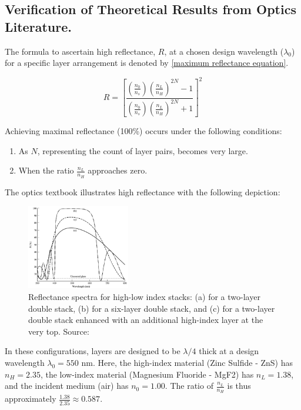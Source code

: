 \subsection{Verification of Theoretical Results from Optics Literature.}
The formula to ascertain high reflectance, $R$, at a chosen design wavelength ($\lambda_0$) for a specific layer arrangement is denoted by \ref{maximum reflectance equation}.

\begin{equation}\label{formula for optimal reflectance - chap4}
    R = \left[ \frac{ \left( \frac{n_0}{n_s} \right) \left( \frac{n_L}{n_H} \right)^{2N}  - 1 }{  \left( \frac{n_0}{n_s} \right) \left( \frac{n_L}{n_H} \right)^{2N}  + 1}  \right]^2
\end{equation}

Achieving maximal reflectance (100\%) occurs under the following conditions:
\begin{enumerate}
    \item As $N$, representing the count of layer pairs, becomes very large.
    \item When the ratio $\frac{n_L}{n_H}$ approaches zero.
\end{enumerate}

The optics textbook illustrates high reflectance with the following depiction:

\begin{figure}[ht!]
\centering
\includegraphics[width=0.4\textwidth]{Chapters/Figures/Chapter 4 Figures/High-Reflectance Graphs in the Optics Book.png}
\caption{Reflectance spectra for high-low index stacks: (a) for a two-layer double stack, (b) for a six-layer double stack, and (c) for a two-layer double stack enhanced with an additional high-index layer at the very top. Source: \cite{pedrotti_introduction_2007}}
\label{fig:Reflectance spectra from optical literature}
\end{figure}

In these configurations, layers are designed to be $\lambda/4$ thick at a design wavelength $\lambda_0 = 550$ nm. Here, the high-index material (Zinc Sulfide - ZnS) has $n_H = 2.35$, the low-index material (Magnesium Fluoride - MgF2) has $n_L = 1.38$, and the incident medium (air) has $n_0 = 1.00$. The ratio of $\frac{n_L}{n_H}$ is thus approximately $\frac{1.38}{2.35} \approx 0.587$.

